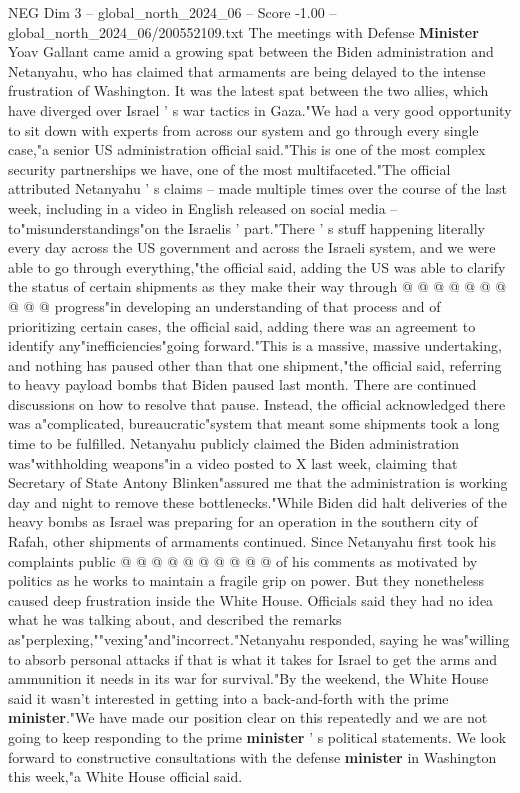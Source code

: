 \begin{textsample}{NEG Dim 3 – global\_north\_2024\_06 – Score -1.00 – global\_north\_2024\_06/200552109.txt}  \label{ex:f3_neg_391}
The meetings with Defense \textbf{Minister} Yoav Gallant came amid a growing spat between the Biden administration and Netanyahu, who has claimed that armaments are being delayed to the intense frustration of Washington.
It was the latest spat between the two allies, which have diverged over Israel ' s war tactics in Gaza."We had a very good opportunity to sit down with experts from across our system and go through every single case,"a senior US administration official said."This is one of the most complex security partnerships we have, one of the most multifaceted."The official attributed Netanyahu ' s claims -- made multiple times over the course of the last week, including in a video in English released on social media -- to"misunderstandings"on the Israelis ' part."There ' s stuff happening literally every day across the US government and across the Israeli system, and we were able to go through everything,"the official said, adding the US was able to clarify the status of certain shipments as they make their way through @ @ @ @ @ @ @ @ @ @ progress"in developing an understanding of that process and of prioritizing certain cases, the official said, adding there was an agreement to identify any"inefficiencies"going forward."This is a massive, massive undertaking, and nothing has paused other than that one shipment,"the official said, referring to heavy payload bombs that Biden paused last month.
There are continued discussions on how to resolve that pause.
Instead, the official acknowledged there was a"complicated, bureaucratic"system that meant some shipments took a long time to be fulfilled.
Netanyahu publicly claimed the Biden administration was"withholding weapons"in a video posted to X last week, claiming that Secretary of State Antony Blinken"assured me that the administration is working day and night to remove these bottlenecks."While Biden did halt deliveries of the heavy bombs as Israel was preparing for an operation in the southern city of Rafah, other shipments of armaments continued.
Since Netanyahu first took his complaints public @ @ @ @ @ @ @ @ @ @ of his comments as motivated by politics as he works to maintain a fragile grip on power.
But they nonetheless caused deep frustration inside the White House.
Officials said they had no idea what he was talking about, and described the remarks as"perplexing,""vexing"and"incorrect."Netanyahu responded, saying he was"willing to absorb personal attacks if that is what it takes for Israel to get the arms and ammunition it needs in its war for survival."By the weekend, the White House said it wasn't interested in getting into a back-and-forth with the prime \textbf{minister}."We have made our position clear on this repeatedly and we are not going to keep responding to the prime \textbf{minister} ' s political statements.
We look forward to constructive consultations with the defense \textbf{minister} in Washington this week,"a White House official said.

\end{textsample}
